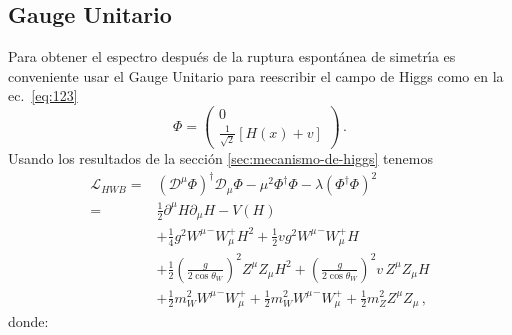 \subsection*{Gauge Unitario}
Para obtener el espectro despu\'es de la ruptura espont\'anea de simetr\'\i a es conveniente usar el Gauge Unitario para reescribir el campo de Higgs como en la ec.~\eqref{eq:123}
\begin{equation}
      \Phi=
  \begin{pmatrix}
    0\\
    \frac{1}{\sqrt{2}}[H(x)+v]
  \end{pmatrix}\,.
\end{equation}
Usando los resultados de la secci\'on \ref{sec:mecanismo-de-higgs} tenemos
\begin{align}
  \mathcal{L}_{H W B}=&\left(\mathcal{D}^\mu\Phi\right)^\dagger\mathcal{D}_\mu\Phi-\mu^2\Phi^\dagger \Phi-\lambda\left(\Phi^\dagger\Phi\right)^2\nonumber\\
  =&\frac{1}{2}\partial^\mu H\partial_\mu H-V(H)\nonumber\\
&+\frac{1}{4}g^2{W^\mu}^-W_\mu^+H^2+\frac{1}{2}vg^2{W^\mu}^-W_\mu^+H\nonumber\\
  &+\frac{1}{2}\left(\frac{g}{2\cos\theta_W}\right)^2Z^\mu Z_\mu H^2+\left(\frac{g}{2\cos\theta_W}\right)^2v\,Z^\mu Z_\mu H\nonumber\\
  &+\frac{1}{2}m_W^2{W^\mu}^-W_\mu^++\frac{1}{2}m_W^2{W^\mu}^-W_\mu^+ +\frac{1}{2}m_Z^2Z^\mu Z_\mu\,,
\end{align}
donde:
